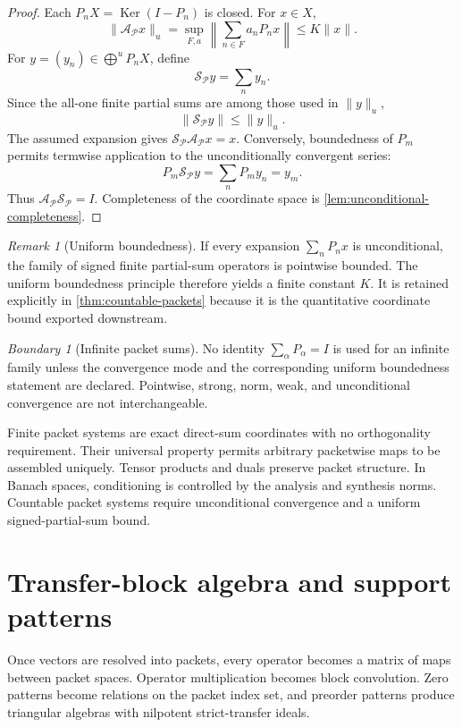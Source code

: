 \documentclass[11pt]{article}
\theoremstyle{definition}
\theoremstyle{remark}
\newtheorem{boundary}[boundary]{Boundary}
\newtheorem{remark}[remark]{Remark}
\theoremstyle{definition}\newtheorem{example}[theorem]{Example}
\newcommand{\Pcal}{\mathcal P}
\newcommand{\Ker}{\operatorname{Ker}}
\newcommand{\RecordID}[1]{\label{record:#1}}
\begin{document}
\begin{proof}
Each $P_nX=\Ker(I-P_n)$ is closed.  For $x\in X$,
\[
\|\mathcal A_{\Pcal}x\|_u
=
\sup_{F,a}
\left\|\sum_{n\in F}a_nP_nx\right\|
\leq K\|x\|.
\]
For $y=(y_n)\in\bigoplus^uP_nX$, define
\[
\mathcal S_{\Pcal}y=\sum_ny_n.
\]
Since the all-one finite partial sums are among those used in $\|y\|_u$,
\[
\|\mathcal S_{\Pcal}y\|
\leq\|y\|_u.
\]
The assumed expansion gives $\mathcal S_{\Pcal}\mathcal A_{\Pcal}x=x$.  Conversely, boundedness of $P_m$ permits termwise application to the unconditionally convergent series:
\[
P_m\mathcal S_{\Pcal}y
=
\sum_nP_my_n
=y_m.
\]
Thus $\mathcal A_{\Pcal}\mathcal S_{\Pcal}=I$.  Completeness of the coordinate space is \cref{lem:unconditional-completeness}.
\end{proof}

\begin{remark}[Uniform boundedness]
\label{rem:uniform-boundedness}
If every expansion $\sum_nP_nx$ is unconditional, the family of signed finite partial-sum operators is pointwise bounded.  The uniform boundedness principle therefore yields a finite constant $K$.  It is retained explicitly in \cref{thm:countable-packets} because it is the quantitative coordinate bound exported downstream.
\end{remark}
\RecordID{PSC-I-R-UNIFORM-BOUNDEDNESS}

\begin{boundary}[Infinite packet sums]
\label{bnd:infinite-packet-topology}
No identity $\sum_\alpha P_\alpha=I$ is used for an infinite family unless the convergence mode and the corresponding uniform boundedness statement are declared.  Pointwise, strong, norm, weak, and unconditional convergence are not interchangeable.
\end{boundary}
\RecordID{PSC-I-B-INFINITE-PACKET-TOPOLOGY}

\begin{sectionrecap}
Finite packet systems are exact direct-sum coordinates with no orthogonality requirement.  Their universal property permits arbitrary packetwise maps to be assembled uniquely.  Tensor products and duals preserve packet structure.  In Banach spaces, conditioning is controlled by the analysis and synthesis norms.  Countable packet systems require unconditional convergence and a uniform signed-partial-sum bound.
\end{sectionrecap}


\section{Transfer-block algebra and support patterns}
\begin{readerroadmap}
Once vectors are resolved into packets, every operator becomes a matrix of maps between packet spaces.  Operator multiplication becomes block convolution.  Zero patterns become relations on the packet index set, and preorder patterns produce triangular algebras with nilpotent strict-transfer ideals.
\end{readerroadmap}
\end{document}
